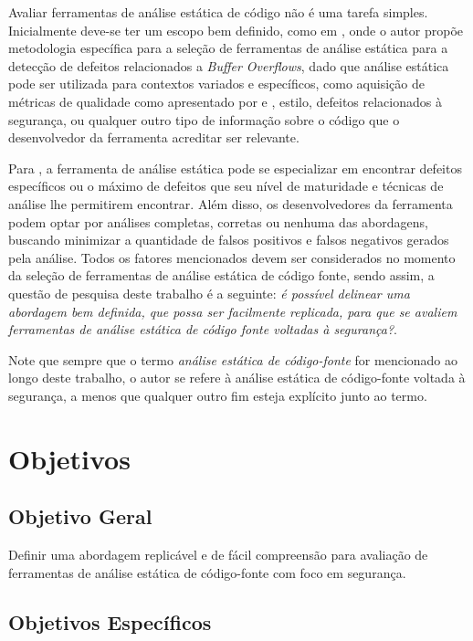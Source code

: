 Avaliar ferramentas de análise estática de código não é uma tarefa simples.
Inicialmente deve-se ter um escopo bem definido, como em \cite{harvard}, onde o autor propõe metodologia específica para a seleção de ferramentas de análise estática para a detecção de defeitos relacionados a \textit{Buffer Overflows}, dado que análise estática pode ser utilizada para contextos variados e específicos, como aquisição de métricas de qualidade como apresentado por \cite{meirelles2013} e \cite{analizoartigo}, estilo, defeitos relacionados à segurança, ou qualquer outro tipo de informação sobre o código que o desenvolvedor da ferramenta acreditar ser relevante.

Para \cite{secure_programming}, a ferramenta de análise estática pode se especializar em encontrar defeitos específicos ou o máximo de defeitos que seu nível de maturidade e técnicas de análise lhe permitirem encontrar. Além disso, os desenvolvedores da ferramenta podem optar por análises completas, corretas ou nenhuma das abordagens, buscando minimizar a quantidade de falsos positivos e falsos negativos gerados pela análise. Todos os fatores mencionados devem ser considerados no momento da seleção de ferramentas de análise estática de código fonte, sendo assim, a questão de pesquisa deste trabalho é a seguinte: \textit{é possível delinear uma abordagem bem definida, que possa ser facilmente replicada, para que se avaliem ferramentas de análise estática de código fonte voltadas à segurança?}.

Note que sempre que o termo \textit{análise estática de código-fonte} for mencionado ao longo deste trabalho, o autor se refere à análise estática de código-fonte voltada à segurança, a menos que qualquer outro fim esteja explícito junto ao termo.

\section*{Objetivos}
\subsection*{Objetivo Geral}

Definir uma abordagem replicável e de fácil compreensão para avaliação de ferramentas de análise estática de código-fonte com foco em segurança.

\subsection*{Objetivos Específicos}

